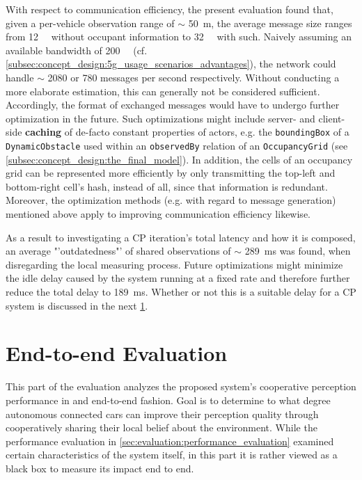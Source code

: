 With respect to communication efficiency, the present evaluation found that, given a per-vehicle observation range of $\sim$ \SI{50}{\meter}, the average message size ranges from \SI{12}{\kilo\byte} without occupant information to \SI{32}{\kilo\byte} with such. Naively assuming an available bandwidth of \SI{200}{\mega\bit} (cf. \cref{subsec:concept_design:5g_usage_scenarios_advantages}), the network could handle $\sim$ 2080 or 780 messages per second respectively. Without conducting a more elaborate estimation, this can generally not be considered sufficient. Accordingly, the format of exchanged messages would have to undergo further optimization in the future. Such optimizations might include server- and client-side \textbf{caching} of de-facto constant properties of actors, e.g. the \texttt{boundingBox} of a \texttt{DynamicObstacle} used within an \texttt{observedBy} relation of an \texttt{OccupancyGrid} (see \cref{subsec:concept_design:the_final_model}). In addition, the cells of an occupancy grid can be represented more efficiently by only transmitting the top-left and bottom-right cell's hash, instead of all, since that information is redundant. Moreover, the optimization methods (e.g. with regard to message generation) mentioned above apply to improving communication efficiency likewise.

As a result to investigating a CP iteration's total latency and how it is composed, an average "'outdatedness"' of shared observations of $\sim$ \SI{289}{\milli\second} was found, when disregarding the local measuring process. Future optimizations might minimize the idle delay caused by the system running at a fixed rate and therefore further reduce the total delay to \SI{189}{\milli\second}. Whether or not this is a suitable delay for a CP system is discussed in the next \cref{sec:evaluation:perception_evaluation}.

\section{End-to-end Evaluation}
\label{sec:evaluation:perception_evaluation}
This part of the evaluation analyzes the proposed system's cooperative perception performance in and end-to-end fashion. Goal is to determine to what degree autonomous connected cars can improve their perception quality through cooperatively sharing their local belief about the environment. While the performance evaluation in \cref{sec:evaluation:performance_evaluation} examined certain characteristics of the system itself, in this part it is rather viewed as a black box to measure its impact end to end. 
\par
\bigskip

